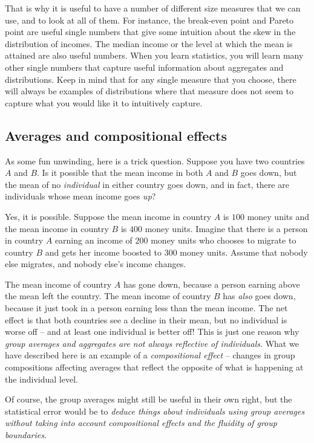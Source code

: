 \documentclass{amsart}
\begin{document}
That is why it is useful to have a number of different size measures
that we can use, and to look at all of them. For instance, the
break-even point and Pareto point are useful single numbers that give
some intuition about the skew in the distribution of incomes. The
median income or the level at which the mean is attained are also
useful numbers. When you learn statistics, you will learn many other
single numbers that capture useful information about aggregates and
distributions. Keep in mind that for any single measure that you
choose, there will always be examples of distributions where that
measure does not seem to capture what you would like it to intuitively
capture.

\subsection*{Averages and compositional effects}

As some fun unwinding, here is a trick question. Suppose you have two
countries $A$ and $B$. Is it possible that the mean income in both $A$
and $B$ goes down, but the mean of no {\em individual} in either
country goes down, and in fact, there are individuals whose mean
income goes {\em up}?

Yes, it is possible. Suppose the mean income in country $A$ is $100$
money units and the mean income in country $B$ is $400$ money
units. Imagine that there is a person in country $A$ earning an income
of $200$ money units who chooses to migrate to country $B$ and gets
her income boosted to $300$ money units. Assume that nobody else
migrates, and nobody else's income changes.

The mean income of country $A$ has gone down, because a person earning
above the mean left the country. The mean income of country $B$ has
{\em also} goes down, because it just took in a person earning less
than the mean income. The net effect is that both countries see a
decline in their mean, but no individual is worse off -- and at least
one individual is better off! This is just one reason why {\em group
averages and aggregates are not always reflective of
individuals}. What we have described here is an example of a {\em
compositional effect} -- changes in group compositions affecting
averages that reflect the opposite of what is happening at the
individual level.

Of course, the group averages might still be useful in their own
right, but the statistical error would be to {\em deduce things about
individuals using group averages without taking into account
compositional effects and the fluidity of group boundaries}.
\end{document}
